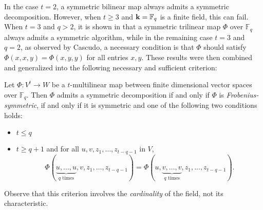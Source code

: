 \documentclass[11pt]{article}
\begin{document}
In the case $t=2$, a symmetric bilinear map always admits a symmetric decomposition.
However, when $t\geq3$ and $\mathbf{k}=\mathbb{F}_q$ is a finite field, this can fail.
When $t=3$ and $q>2$, it is shown in \cite[Lemma~7]{SL84} that a symmetric trilinear map $\Phi$ over $\mathbb{F}_q$ always admits a symmetric algorithm,
while in the remaining case $t=3$ and $q=2$, as observed by Cascudo,
a necessary condition is that $\Phi$ should satisfy $\Phi(x,x,y)=\Phi(x,y,y)$
for all entries $x,y$.
These results were then combined and generalized into the following necessary and sufficient criterion:
\begin{thm}\label{th:criterion}
Let $\Phi:V^t\to W$ be a $t$-multilinear map between finite dimensional vector spaces over $\mathbb{F}_q$.
Then $\Phi$ admits a symmetric decomposition if and only if $\Phi$ is \emph{Frobenius-symmetric},
\ie if and only if it is symmetric and one of the following two conditions holds:
\begin{itemize}
\item $t\leq q$
\item $t\geq q+1$ and for all $u,v,z_1,\dots,z_{t-q-1}$ in $V$,
\[
\Phi(\underset{\textrm{$q$ times}}{\underbrace{u,\dots,u}},v,z_1,\dots,z_{t-q-1})=\Phi(u,\underset{\textrm{$q$ times}}{\underbrace{v,\dots,v}},z_1,\dots,z_{t-q-1}).
\]
\end{itemize}
\end{thm}
Observe that this criterion involves the \emph{cardinality} of the field, not its characteristic.
\end{document}
